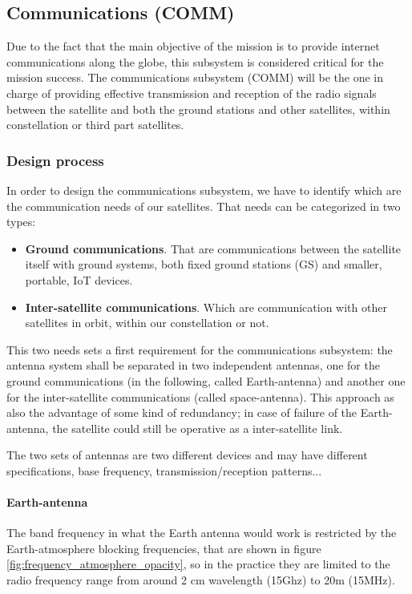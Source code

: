 \subsection{Communications (COMM)}
Due to the fact that the main objective of the mission is to provide internet
communications along the globe, this subsystem is considered critical for the
mission success. The communications subsystem (COMM) will be the one in charge
of providing effective transmission and reception of the radio signals between the
satellite and both the ground stations and other satellites, within \MissionName
constellation or third part satellites.

\subsubsection{Design process}
In order to design the communications subsystem, we have to identify which are
the communication needs of our satellites. That needs can be categorized in two types:

\begin{itemize}
	\item \textbf{Ground communications}. That are communications between the
	satellite itself with ground systems, both fixed ground stations (GS) and
	smaller, portable, IoT devices.
	\item \textbf{Inter-satellite communications}. Which are communication
	with other satellites in orbit, within our constellation or not.
\end{itemize}

This two needs sets a first requirement for the communications subsystem:
the antenna system shall be separated in two independent antennas, one for the
ground communications (in the following, called Earth-antenna) and another one for
the inter-satellite communications (called space-antenna). This approach as also the
advantage of some kind of redundancy; in case of failure of the Earth-antenna, the
satellite could still be operative as a inter-satellite link.

The two sets of antennas are two different devices and may have different
specifications, base frequency, transmission/reception patterns...

\paragraph{Earth-antenna}

The band frequency in what the Earth antenna would work
is restricted by the Earth-atmosphere blocking frequencies, that are shown in
figure \ref{fig:frequency_atmosphere_opacity}, so in the practice they are limited
to the radio frequency range from around 2 cm wavelength (15Ghz) to 20m (15MHz).

